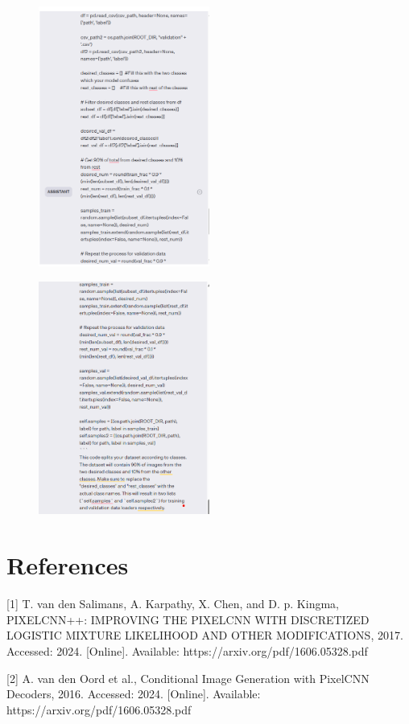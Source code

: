 \documentclass{article}
\begin{document}
\begin{figure}[H]
    \centering
    \includegraphics[width=0.5\textwidth]{report_data/g-18.png}
\end{figure}

\begin{figure}[H]
    \centering
    \includegraphics[width=0.5\textwidth]{report_data/g-19.png}
\end{figure}



\section*{References}
[1] T. van den Salimans, A. Karpathy, X. Chen, and D. p. Kingma, PIXELCNN++: IMPROVING THE PIXELCNN WITH DISCRETIZED LOGISTIC MIXTURE LIKELIHOOD AND OTHER MODIFICATIONS, 2017. Accessed: 2024. [Online]. Available: https://arxiv.org/pdf/1606.05328.pdf

[2] A. van den Oord et al., Conditional Image Generation with PixelCNN Decoders, 2016. Accessed: 2024. [Online]. Available: https://arxiv.org/pdf/1606.05328.pdf
\end{document}
